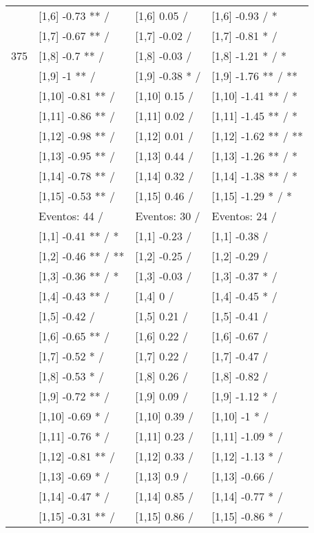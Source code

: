 \begin{table}
\begin{tabular}[t]{llll}
 & {}[1,6] -0.73 ** / & {}[1,6] 0.05  / & {}[1,6] -0.93  / *\\
 & {}[1,7] -0.67 ** / & {}[1,7] -0.02  / & {}[1,7] -0.81 * /\\
375 & {}[1,8] -0.7 ** / & {}[1,8] -0.03  / & {}[1,8] -1.21 * / *\\
\addlinespace
 & {}[1,9] -1 ** / & {}[1,9] -0.38 * / & {}[1,9] -1.76 ** / **\\
 & {}[1,10] -0.81 ** / & {}[1,10] 0.15  / & {}[1,10] -1.41 ** / *\\
 & {}[1,11] -0.86 ** / & {}[1,11] 0.02  / & {}[1,11] -1.45 ** / *\\
 & {}[1,12] -0.98 ** / & {}[1,12] 0.01  / & {}[1,12] -1.62 ** / **\\
 & {}[1,13] -0.95 ** / & {}[1,13] 0.44  / & {}[1,13] -1.26 ** / *\\
\addlinespace
 & {}[1,14] -0.78 ** / & {}[1,14] 0.32  / & {}[1,14] -1.38 ** / *\\
 & {}[1,15] -0.53 ** / & {}[1,15] 0.46  / & {}[1,15] -1.29 * / *\\
 & Eventos:  44 / & Eventos:  30 / & Eventos:  24 /\\
 & {}[1,1] -0.41 ** / * & {}[1,1] -0.23  / & {}[1,1] -0.38  /\\
 & {}[1,2] -0.46 ** / ** & {}[1,2] -0.25  / & {}[1,2] -0.29  /\\
\addlinespace
 & {}[1,3] -0.36 ** / * & {}[1,3] -0.03  / & {}[1,3] -0.37 * /\\
 & {}[1,4] -0.43 ** / & {}[1,4] 0  / & {}[1,4] -0.45 * /\\
 & {}[1,5] -0.42  / & {}[1,5] 0.21  / & {}[1,5] -0.41  /\\
 & {}[1,6] -0.65 ** / & {}[1,6] 0.22  / & {}[1,6] -0.67  /\\
 & {}[1,7] -0.52 * / & {}[1,7] 0.22  / & {}[1,7] -0.47  /\\
\addlinespace
500 & {}[1,8] -0.53 * / & {}[1,8] 0.26  / & {}[1,8] -0.82  /\\
 & {}[1,9] -0.72 ** / & {}[1,9] 0.09  / & {}[1,9] -1.12 * /\\
 & {}[1,10] -0.69 * / & {}[1,10] 0.39  / & {}[1,10] -1 * /\\
 & {}[1,11] -0.76 * / & {}[1,11] 0.23  / & {}[1,11] -1.09 * /\\
 & {}[1,12] -0.81 ** / & {}[1,12] 0.33  / & {}[1,12] -1.13 * /\\
\addlinespace
 & {}[1,13] -0.69 * / & {}[1,13] 0.9  / & {}[1,13] -0.66  /\\
 & {}[1,14] -0.47 * / & {}[1,14] 0.85  / & {}[1,14] -0.77 * /\\
 & {}[1,15] -0.31 ** / & {}[1,15] 0.86  / & {}[1,15] -0.86 * /\\
\bottomrule
\end{tabular}
\end{table}

